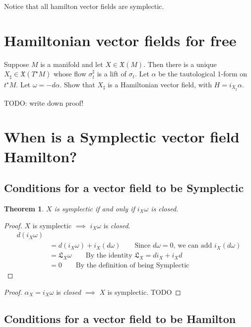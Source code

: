 \documentclass[11pt]{book}
\newcommand{\Lie}{\ensuremath{\mathfrak{L}}}
\newcommand{\vectorfield}{\ensuremath{\mathfrak{X}}}
\newtheorem{theorem}{Theorem}
\newtheorem{proof}[theorem]{Proof}
\begin{document}
Notice that all hamilton vector fields are symplectic. 

\section{Hamiltonian vector fields for free}
Suppose $M$ is a manifold and let $X \in \vectorfield(M)$. Then there is
a unique $X_\sharp \in \vectorfield(T^\star M)$ whose flow $\sigma^\sharp_t$
is a lift of $\sigma_t$. Let $\alpha$ be the tautological 1-form on $t^\star M$.
Let $\omega = -d \alpha$. Show that $X_\sharp$ is a Hamiltonian vector field,
with $H = i_{X_\sharp} \alpha$.

TODO: write down proof!

\section{When is a Symplectic vector field Hamilton?}

\subsection{Conditions for a vector field to be Symplectic}

\begin{theorem}
$X$ is symplectic if and only if $i_X \omega$ is \emph{closed}.
\end{theorem}

\begin{proof}
        $X$ is symplectic $\implies$ $i_X \omega$ is \emph{closed}.
\begin{align*}
d (i_X \omega) \\
        &= d (i_X \omega) + i_X (d \omega) \qquad \text{Since $d \omega = 0$, we can add $i_X (d \omega)$} \\
        &= \Lie_X \omega \qquad \text{By the identity $\Lie_X = d i_X + i_X d$} \\
        &= 0 \qquad \text{By the definition of being Symplectic}
\end{align*}
\end{proof}

\begin{proof}
        $\alpha_X = i_X \omega$ is \emph{closed} $\implies$ $X$ is symplectic.
        TODO
\end{proof}


\subsection{Conditions for a vector field to be Hamilton}
\end{document}
